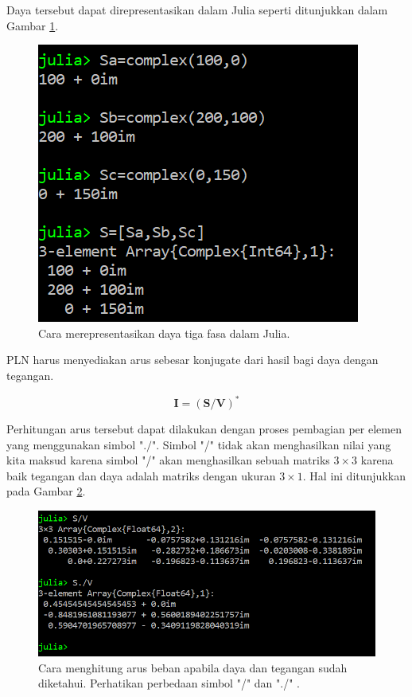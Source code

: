 \documentclass[12pt,a4paper]{memoir}
\begin{document}
Daya tersebut dapat direpresentasikan dalam Julia seperti ditunjukkan dalam Gambar \ref{fig:complexnumber6}.

\begin{figure}
	\centering
	\includegraphics[width=0.7\linewidth]{images/complexnumber6}
	\caption{Cara merepresentasikan daya tiga fasa dalam Julia.}
	\label{fig:complexnumber6}
\end{figure}



PLN harus menyediakan arus sebesar konjugate dari hasil bagi daya dengan tegangan.

\begin{equation}
\mathbf{I}=(\mathbf{S/V})^*
\end{equation}

Perhitungan arus tersebut dapat dilakukan dengan proses pembagian per elemen yang menggunakan simbol "$./$". Simbol "/" tidak akan menghasilkan nilai yang kita maksud karena simbol "/" akan menghasilkan sebuah matriks $3 \times 3$ karena baik tegangan dan daya adalah matriks dengan ukuran $3 \times 1$. Hal ini ditunjukkan pada Gambar \ref{fig:complexnumber7}.

\begin{figure}
	\centering
	\includegraphics[width=1\linewidth]{images/complexnumber7}
	\caption{Cara menghitung arus beban apabila daya dan tegangan sudah diketahui. Perhatikan perbedaan simbol "/" dan "./" .}
	\label{fig:complexnumber7}
\end{figure}
\end{document}

